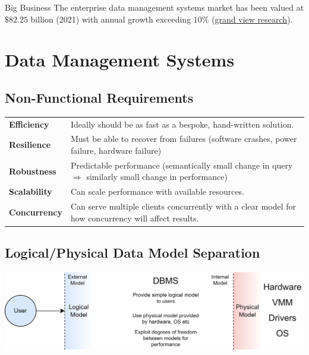 \begin{sidenotebox}{Big Business}
    The enterprise data management systems market has been valued at $\$82.25$ billion (2021) with annual growth exceeding $10\%$ (\href{https://www.grandviewresearch.com/industry-analysis/enterprise-data-management-market}{grand view research}).
\end{sidenotebox}

\section{Data Management Systems}
\subsection{Non-Functional Requirements}
\begin{center}
    \begin{tabular}{l p{}}
        \textbf{Efficiency}  & Ideally should be as fast as a bespoke, hand-written solution.                                                   \\
        \textbf{Resilience}  & Must be able to recover from failures (software crashes, power failure, hardware failure)                        \\
        \textbf{Robustness}  & Predictable performance (semantically small change in query $\Rightarrow$ similarly small change in performance) \\
        \textbf{Scalability} & Can scale performance with available resources.                                                                  \\
        \textbf{Concurrency} & Can serve multiple clients concurrently with a clear model for how concurrency will affect results.              \\
    \end{tabular}
\end{center}

\subsection{Logical/Physical Data Model Separation}
\begin{center}
    \includegraphics[width=.8\textwidth]{introduction/images/model_separation.drawio.png}
\end{center}

